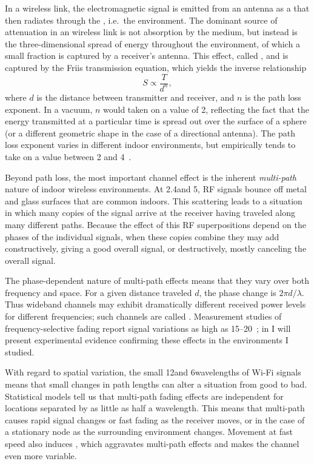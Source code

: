 In a wireless link, the electromagnetic signal is emitted from an antenna as a  that then radiates through the , i.e.\ the environment. The dominant source of attenuation in an wireless link is not absorption by the medium, but instead is the three-dimensional spread of energy throughout the environment, of which a small fraction is captured by a receiver's antenna. This effect, called , and is captured by the Friis transmission equation, which yields the inverse relationship
\begin{equation}
\label{eq:friis}
	S \propto \frac{T}{d^n},
\end{equation}
where $d$ is the distance between transmitter and receiver, and $n$ is the path loss exponent. In a vacuum, $n$ would taken on a value of 2, reflecting the fact that the energy transmitted at a particular time is spread out over the surface of a sphere (or a different geometric shape in the case of a directional antenna). The path loss exponent varies in different indoor environments, but empirically tends to take on a value between 2 and 4~\cite{Sklar}.

Beyond path loss, the most important channel effect is the inherent \emph{multi-path} nature of indoor wireless environments. At 2.4\GHz and 5\GHz, RF signals bounce off metal and glass surfaces that are common indoors. This scattering leads to a situation in which many copies of the signal arrive at the receiver having traveled along many different paths. Because the effect of this RF superpositions depend on the phases of the individual signals, when these copies combine they may add constructively, giving a good overall signal, or destructively, mostly canceling the overall signal.

The phase-dependent nature of multi-path effects means that they vary over both frequency and space. For a given distance traveled $d$, the phase change is $2\pi d/\lambda$. Thus wideband channels may exhibit dramatically different received power levels for different frequencies; such channels are called . Measurement studies of frequency-selective fading report signal variations as high as 15--20\dB~\cite{Judd_CHARM}; in  I will present experimental evidence confirming these effects in the environments I studied.

With regard to spatial variation, the small 12\cm and 6\cm wavelengths of Wi-Fi signals means that small changes in path lengths can alter a situation from good to bad. Statistical models tell us that multi-path fading effects are independent for locations separated by as little as half a wavelength. This means that multi-path causes rapid signal changes or fast fading as the receiver moves, or in the case of a stationary node as the surrounding environment changes.  Movement at fast speed also induces , which aggravates multi-path effects and makes the channel even more variable.

